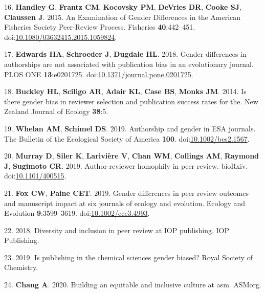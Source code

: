 \documentclass[11pt,]{article}
\begin{document}
\leavevmode\hypertarget{ref-handley_examination_2015}{}%
16. \textbf{Handley G}, \textbf{Frantz CM}, \textbf{Kocovsky PM},
\textbf{DeVries DR}, \textbf{Cooke SJ}, \textbf{Claussen J}. 2015. An
Examination of Gender Differences in the American Fisheries Society
Peer-Review Process. Fisheries \textbf{40}:442--451.
doi:\href{https://doi.org/10.1080/03632415.2015.1059824}{10.1080/03632415.2015.1059824}.

\leavevmode\hypertarget{ref-edwards_gender_2018}{}%
17. \textbf{Edwards HA}, \textbf{Schroeder J}, \textbf{Dugdale HL}.
2018. Gender differences in authorships are not associated with
publication bias in an evolutionary journal. PLOS ONE
\textbf{13}:e0201725.
doi:\href{https://doi.org/10.1371/journal.pone.0201725}{10.1371/journal.pone.0201725}.

\leavevmode\hypertarget{ref-buckley_is_2014}{}%
18. \textbf{Buckley HL}, \textbf{Sciligo AR}, \textbf{Adair KL},
\textbf{Case BS}, \textbf{Monks JM}. 2014. Is there gender bias in
reviewer selection and publication success rates for the. New Zealand
Journal of Ecology \textbf{38}:5.

\leavevmode\hypertarget{ref-Whelan2019}{}%
19. \textbf{Whelan AM}, \textbf{Schimel DS}. 2019. Authorship and gender
in ESA journals. The Bulletin of the Ecological Society of America
\textbf{100}.
doi:\href{https://doi.org/10.1002/bes2.1567}{10.1002/bes2.1567}.

\leavevmode\hypertarget{ref-Murray400515}{}%
20. \textbf{Murray D}, \textbf{Siler K}, \textbf{Larivière V},
\textbf{Chan WM}, \textbf{Collings AM}, \textbf{Raymond J},
\textbf{Sugimoto CR}. 2019. Author-reviewer homophily in peer review.
bioRxiv. doi:\href{https://doi.org/10.1101/400515}{10.1101/400515}.

\leavevmode\hypertarget{ref-fox_gender_2019}{}%
21. \textbf{Fox CW}, \textbf{Paine CET}. 2019. Gender differences in
peer review outcomes and manuscript impact at six journals of ecology
and evolution. Ecology and Evolution \textbf{9}:3599--3619.
doi:\href{https://doi.org/10.1002/ece3.4993}{10.1002/ece3.4993}.

\leavevmode\hypertarget{ref-Physics_2018}{}%
22. 2018. Diversity and inclusion in peer review at IOP publishing. IOP
Publishing.

\leavevmode\hypertarget{ref-RoyalChem_2019}{}%
23. 2019. Is publishing in the chemical sciences gender biased? Royal
Society of Chemistry.

\leavevmode\hypertarget{ref-chang_2020}{}%
24. \textbf{Chang A}. 2020. Building an equitable and inclusive culture
at asm. ASMorg.
\end{document}
